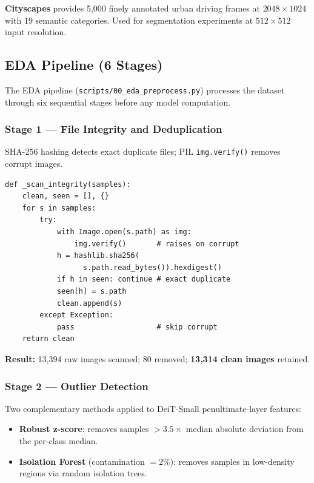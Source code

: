 \documentclass[conference]{IEEEtran}
\begin{document}
\textbf{Cityscapes} provides 5,000 finely annotated urban driving frames
at $2048{\times}1024$ with 19 semantic categories.
Used for segmentation experiments at $512{\times}512$ input resolution.

\subsection{EDA Pipeline (6 Stages)}

The EDA pipeline (\texttt{scripts/00\_eda\_preprocess.py}) processes the
dataset through six sequential stages before any model computation.

\subsubsection{Stage 1 --- File Integrity and Deduplication}

SHA-256 hashing detects exact duplicate files; PIL \texttt{img.verify()}
removes corrupt images.

\begin{lstlisting}[caption={File integrity scan and SHA-256 dedup.},label={lst:dedup}]
def _scan_integrity(samples):
    clean, seen = [], {}
    for s in samples:
        try:
            with Image.open(s.path) as img:
                img.verify()       # raises on corrupt
            h = hashlib.sha256(
                  s.path.read_bytes()).hexdigest()
            if h in seen: continue # exact duplicate
            seen[h] = s.path
            clean.append(s)
        except Exception:
            pass                   # skip corrupt
    return clean
\end{lstlisting}

\textbf{Result:} 13,394 raw images scanned; 80 removed;
\textbf{13,314 clean images} retained.

\subsubsection{Stage 2 --- Outlier Detection}

Two complementary methods applied to DeiT-Small penultimate-layer features:

\begin{itemize}[leftmargin=*,noitemsep]
\item \textbf{Robust z-score}: removes samples $> 3.5\times$ median
  absolute deviation from the per-class median.
\item \textbf{Isolation Forest} (contamination $= 2\%$): removes samples
  in low-density regions via random isolation trees.
\end{itemize}
\end{document}

